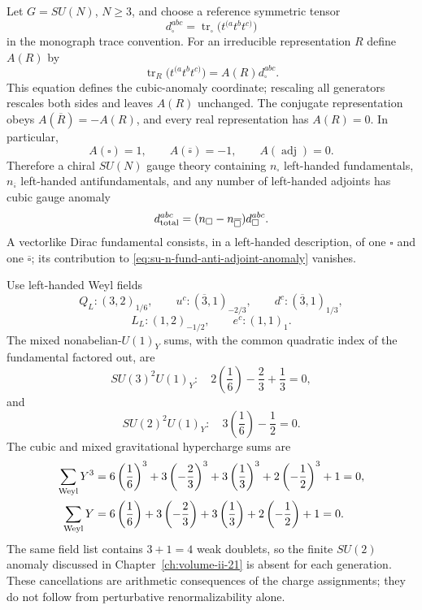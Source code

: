 \begin{example}
\label{ex:su-n-fundamental-adjoint-anomaly}
Let \(G=SU(N)\), \(N\geq3\), and choose a reference symmetric tensor
\[
  d_\square^{abc}
  =
  \operatorname{tr}_{\square}
  \bigl(t^{(a}t^b t^{c)}\bigr)
\]
in the monograph trace convention.  For an irreducible representation \(R\)
define \(A(R)\) by
\[
  \operatorname{tr}_{R}
  \bigl(t^{(a}t^b t^{c)}\bigr)
  =
  A(R)d_\square^{abc}.
\]
This equation defines the cubic-anomaly coordinate; rescaling all generators
rescales both sides and leaves \(A(R)\) unchanged.  The conjugate
representation obeys \(A(\overline R)=-A(R)\), and every real representation
has \(A(R)=0\).  In particular,
\[
  A(\square)=1,
  \qquad
  A(\overline\square)=-1,
  \qquad
  A(\operatorname{adj})=0 .
\]
Therefore a chiral \(SU(N)\) gauge theory containing
\(n_\square\) left-handed fundamentals,
\(n_{\overline\square}\) left-handed antifundamentals, and any number of
left-handed adjoints has cubic gauge anomaly
\begin{equation}
  d_{\rm total}^{abc}
  =
  (n_\square-n_{\overline\square})d_\square^{abc}.
  \label{eq:su-n-fund-anti-adjoint-anomaly}
\end{equation}
A vectorlike Dirac fundamental consists, in a left-handed description, of one
\(\square\) and one \(\overline\square\); its contribution to
\eqref{eq:su-n-fund-anti-adjoint-anomaly} vanishes.
\end{example}

\begin{example}
\label{ex:standard-model-anomaly-sums}
Use left-handed Weyl fields
\[
  Q_L:(3,2)_{1/6},\qquad
  u^c:(\overline3,1)_{-2/3},\qquad
  d^c:(\overline3,1)_{1/3},
\]
\[
  L_L:(1,2)_{-1/2},\qquad
  e^c:(1,1)_1 .
\]
The mixed nonabelian-\(U(1)_Y\) sums, with the common quadratic index of the
fundamental factored out, are
\[
  SU(3)^2U(1)_Y:
  \quad
  2\!\left(\frac16\right)
  -\frac23
  +\frac13
  =
  0,
\]
and
\[
  SU(2)^2U(1)_Y:
  \quad
  3\!\left(\frac16\right)
  -\frac12
  =
  0.
\]
The cubic and mixed gravitational hypercharge sums are
\begin{equation}
\begin{aligned}
  \sum_{\rm Weyl}Y^3
  &=
  6\left(\frac16\right)^3
  +3\left(-\frac23\right)^3
  +3\left(\frac13\right)^3
  +2\left(-\frac12\right)^3
  +1
  =
  0,
\\
  \sum_{\rm Weyl}Y
  &=
  6\left(\frac16\right)
  +3\left(-\frac23\right)
  +3\left(\frac13\right)
  +2\left(-\frac12\right)
  +1
  =
  0 .
\end{aligned}
  \label{eq:standard-model-hypercharge-anomaly-sums}
\end{equation}
The same field list contains \(3+1=4\) weak doublets, so the finite
\(SU(2)\) anomaly discussed in Chapter~\ref{ch:volume-ii-21} is absent for
each generation.  These cancellations are arithmetic consequences of the
charge assignments; they do not follow from perturbative renormalizability
alone.
\end{example}

